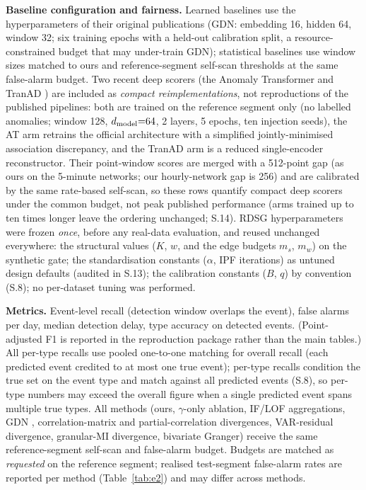 \documentclass[11pt,a4paper]{article}
\newcommand{\RDSG}{RDSG}
\begin{document}
\textbf{Baseline configuration and fairness.} Learned baselines use the
hyperparameters of their original publications (GDN: embedding 16, hidden 64,
window 32; six training epochs with a held-out calibration split, a
resource-constrained budget that may under-train GDN);
statistical baselines use window sizes matched to ours and reference-segment
self-scan thresholds at the same false-alarm budget. Two recent deep scorers
(the Anomaly Transformer \citep{xu2022anomaly} and TranAD \citep{tuli2022tranad})
are included as \emph{compact reimplementations}, not reproductions of the
published pipelines: both are trained on the reference segment only (no
labelled anomalies; window 128, $d_{\rm model}{=}64$, 2 layers, 5 epochs,
ten injection seeds), the AT arm retrains the official architecture with a
simplified jointly-minimised association discrepancy, and the TranAD arm is
a reduced single-encoder reconstructor. Their point-window scores are merged with a 512-point gap (as ours
on the 5-minute networks; our hourly-network gap is 256) and are calibrated by the same rate-based
self-scan, so these rows quantify compact deep scorers under the common
budget, not peak published performance (arms trained up to ten times
longer leave the ordering unchanged; S.14). \RDSG{} hyperparameters
were frozen \emph{once}, before any real-data evaluation, and reused
unchanged everywhere: the structural values ($K$, $w$, and the edge
budgets $m_s$, $m_w$) on the synthetic gate; the standardisation
constants ($\alpha$, IPF iterations) as untuned design defaults
(audited in S.13); the calibration constants ($B$, $q$) by convention
(S.8); no per-dataset tuning was performed.

\textbf{Metrics.} Event-level recall (detection window overlaps the event),
false alarms per day, median detection delay, type accuracy on detected
events. (Point-adjusted F1 is reported in the reproduction package
rather than the main tables.) All per-type
recalls use pooled one-to-one matching for overall recall (each predicted
event credited to at most one true event); per-type recalls condition the
true set on the event type and match against all predicted events (S.8), so
per-type numbers may exceed the overall figure when a single predicted
event spans multiple true types. All methods (ours,
$\gamma$-only ablation, IF/LOF aggregations, GDN \citep{deng2021gdn},
correlation-matrix and partial-correlation divergences, VAR-residual
divergence, granular-MI divergence, bivariate Granger) receive the same
reference-segment self-scan and false-alarm budget. Budgets are matched
as \emph{requested} on the reference segment; realised test-segment
false-alarm rates are reported per method (Table~\ref{tab:e2}) and may
differ across methods.
\end{document}
